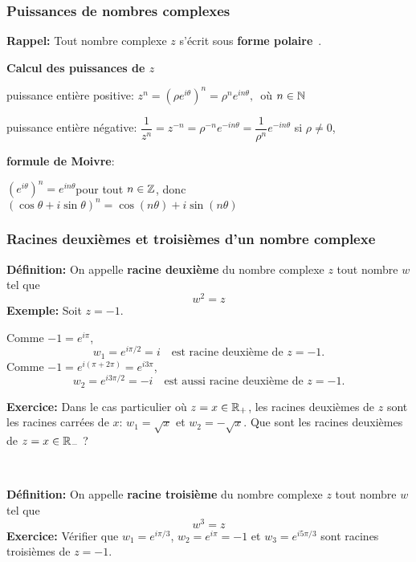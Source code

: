 \begin{frame}%
\frametitle{\bf Puissances de nombres complexes} 
\medskip 

{\bf Rappel:} 
Tout nombre complexe $z$ s'écrit sous
{\bf forme polaire}\ .
\vspace*{2mm}

\vspace*{3mm}

\pause
{\bf Calcul des puissances de $z$} 

\begin{itemize}
\bitem 
{puissance enti\`ere positive}: $\boxed{z^n =(\rho e^{i\theta})^n=\rho^n e^{in\theta}},$\ 
o\`u $n\in\mathbb N$
\vspace*{1.5mm}

\pause
\bitem 
{ puissance enti\`ere négative}: $\dfrac{1}{z^n}= z^{-n} =  \rho^{-n} e^{-i n\theta}
=\dfrac{1}{\rho^n} e^{-in\theta}$ si $\rho\neq 0$, 
\vspace*{1.5mm}

\pause
\bitem 
\parbox[t]{3cm}{{\bf formule de Moivre}:}
\quad 
\parbox[t]{6.4cm}{
$(e^{i\theta})^n=e^{in\theta}$\quad pour tout $n\in\mathbb Z$, donc 
\vspace*{2mm} \\ 
$\boxed{(\cos \theta +i \sin \theta)^n =\cos (n\theta) +i \sin (n\theta)}$} 
\end{itemize}

\end{frame}


\begin{frame}
\frametitle{\bf Racines deuxièmes et troisièmes d'un nombre complexe} 
\medskip 

{\bf Définition:} On appelle {\bf racine deuxième} du nombre complexe $z$ tout nombre $w$ tel que
$$
w^2=z
$$
{\bf Exemple:} Soit $z=-1$. 

Comme $-1=e^{i\pi}$, 
$$w_1=e^{i\pi/2}=i \quad \text{est racine deuxième de $z=-1$.}$$ 
Comme $-1=e^{i(\pi+2\pi)}=e^{i3\pi}$, 
$$w_2=e^{i3\pi/2}=-i\quad \text{est aussi racine deuxième de $z=-1$.}$$

{\bf Exercice:} Dans le cas particulier où $z=x\in\mathbb R_+$, les racines deuxièmes de $z$ sont les racines carrées de $x$: $w_1=\sqrt x$ et $w_2=-\sqrt x$. Que sont les racines deuxièmes de $z=x\in\mathbb R_{-}$ ?

\

{\bf Définition:} On appelle {\bf racine troisième} du nombre complexe $z$ tout nombre $w$ tel que
$$
w^3=z
$$
{\bf Exercice:} Vérifier que $w_1=e^{i\pi/3}$, $w_2=e^{i\pi}=-1$ et $w_3=e^{i5\pi/3}$ sont racines troisièmes de $z=-1$.
\end{frame}

